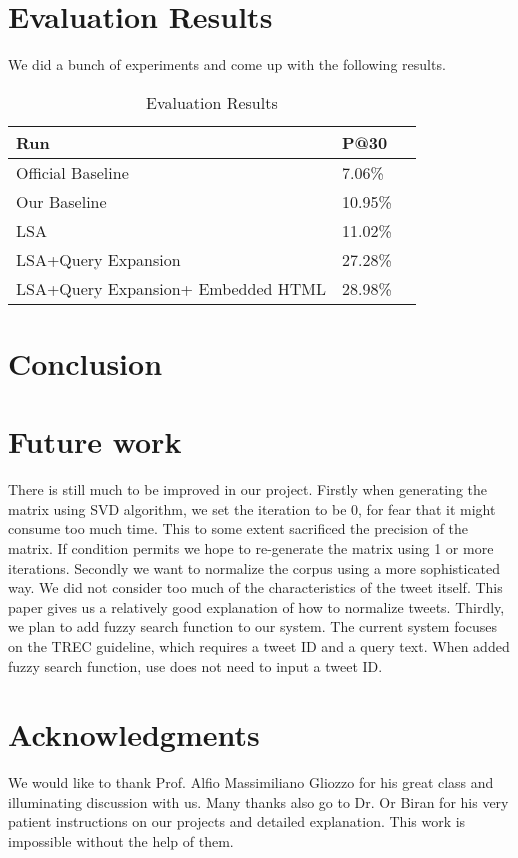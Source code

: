 \documentclass{acm_proc_article-sp}
\begin{document}
\section{Evaluation Results}
We did a bunch of experiments and come up with the following results.
\begin{table}
\centering
\caption{Evaluation Results}
\begin{tabular}{|l|l|l} \hline
Run&P@30\\ \hline
Official Baseline&7.06\%\\ \hline
Our Baseline&10.95\%\\ \hline
LSA&11.02\%\\ \hline
LSA+Query Expansion&27.28\%\\ \hline
LSA+Query Expansion+ Embedded HTML&28.98\%\\ \hline
\hline\end{tabular}
\end{table}


\section{Conclusion}

\section{Future work}
There is still much to be improved in our project. Firstly when generating the matrix using SVD algorithm, we set the iteration to be 0, for fear that it might consume too much time. This to some extent sacrificed the precision of the matrix. If condition permits we hope to re-generate the matrix using 1 or more iterations. Secondly we want to normalize the corpus using a more sophisticated way. We did not consider too much of the characteristics of the tweet itself. This paper \cite{han2011lexical} gives us a relatively good explanation of how to normalize tweets. Thirdly, we plan to add fuzzy search function to our system. The current system focuses on the TREC guideline, which requires a tweet ID and a query text. When added fuzzy search function, use does not need to input a tweet ID. 

\section{Acknowledgments}
We would like to thank Prof. Alfio Massimiliano Gliozzo for his great class and illuminating discussion with us. Many thanks also go to Dr. Or Biran for his very patient instructions on our projects and detailed explanation. This work is impossible without the help of them. 



\balancecolumns
\end{document}

